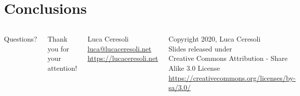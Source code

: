 \documentclass[xetex,table,table]{beamer}
\begin{document}
\section{Conclusions}

\begin{frame}
  \begin{columns}
    \center

    {\Huge Questions?}

    \center

    {\Large Thank you for your attention!}

    \vspace{0.15\textheight}

    {\Large Luca Ceresoli}\\
    \href{mailto:luca@lucaceresoli.net}{luca@lucaceresoli.net}\\
    \url{https://lucaceresoli.net}

    \vspace{0.05\textheight}

    \tiny
    \textcopyright{} Copyright 2020, Luca Ceresoli\\
    Slides released under\\
    Creative Commons Attribution - Share Alike 3.0 License \\
    \url{https://creativecommons.org/licenses/by-sa/3.0/} \\
\end{columns}
\end{frame}
\end{document}
